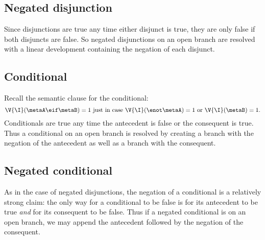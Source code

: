 \subsection{Negated disjunction}

Since disjunctions are true any time either disjunct is true, they are only false if both disjuncts are false.
So negated disjunctions on an open branch are resolved with a linear development containing the negation of each disjunct.


\subsection{Conditional}

Recall the semantic clause for the conditional:
$$\V{\I}(\metaA \eif \metaB)=1 ~\text{just in case}~ \V{\I}(\enot \metaA)=1 ~\text{or}~ \V{\I}(\metaB)=1.$$ 
Conditionals are true any time the antecedent is false or the consequent is true.
Thus a conditional on an open branch is resolved by creating a branch with the negation of the antecedent as well as a branch with the consequent.


\subsection{Negated conditional}

As in the case of negated disjunctions, the negation of a conditional is a relatively strong claim: the only way for a conditional to be false is for its antecedent to be true \emph{and} for its consequent to be false.
Thus if a negated conditional is on an open branch, we may append the antecedent followed by the negation of the consequent.


